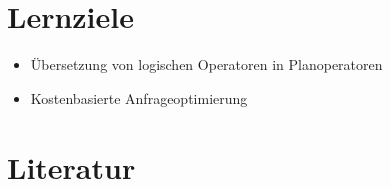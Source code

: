 \section*{Lernziele}

\begin{itemize}
	\item Übersetzung von logischen Operatoren in Planoperatoren
	\item Kostenbasierte Anfrageoptimierung
\end{itemize}


\section*{Literatur}



